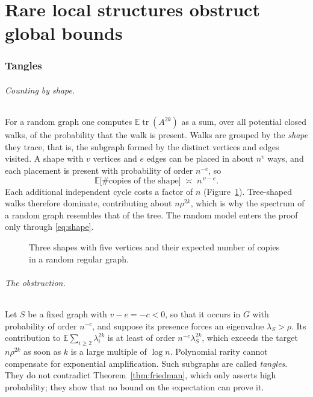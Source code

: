 \documentclass[11pt,letterpaper]{article}
\theoremstyle{definition}
\theoremstyle{remark}
\DeclareMathOperator{\tr}{tr}
\newcommand{\E}{\mathbb{E}}
\begin{document}
\part{Rare local structures obstruct global bounds}
\section{Tangles}

\paragraph{Counting by shape.}
For a random graph one computes $\E\tr(A^{2k})$ as a sum, over all potential closed walks, of the
probability that the walk is present. Walks are grouped by the \emph{shape} they trace, that is,
the subgraph formed by the distinct vertices and edges visited. A shape with $v$ vertices and
$e$ edges can be placed in about $n^v$ ways, and each placement is present with probability of
order $n^{-e}$, so
\begin{equation}\label{eq:shape}
  \E\bigl[\#\text{copies of the shape}\bigr]\;\asymp\;n^{\,v-e}.
\end{equation}
Each additional independent cycle costs a factor of $n$ (Figure~\ref{fig:shapes}). Tree-shaped
walks therefore dominate, contributing about $n\rho^{2k}$, which is why the spectrum of a random
graph resembles that of the tree. The random model enters the proof only through
\eqref{eq:shape}.

\begin{figure}[ht]
  \centering
  
  \caption{Three shapes with five vertices and their expected number of copies in a random
  regular graph.}
  \label{fig:shapes}
\end{figure}

\paragraph{The obstruction.}
Let $S$ be a fixed graph with $v-e=-c<0$, so that it occurs in $G$ with probability of order
$n^{-c}$, and suppose its presence forces an eigenvalue $\lambda_S>\rho$. Its contribution to
$\E\sum_{i\ge2}\lambda_i^{2k}$ is at least of order $n^{-c}\lambda_S^{2k}$, which exceeds the
target $n\rho^{2k}$ as soon as $k$ is a large multiple of $\log n$. Polynomial rarity cannot
compensate for exponential amplification. Such subgraphs are called \emph{tangles}. They do not
contradict Theorem~\ref{thm:friedman}, which only asserts high probability; they show that no
bound on the expectation can prove it.
\end{document}
